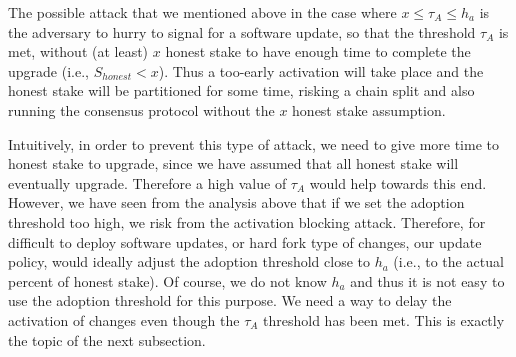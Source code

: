 The possible attack that we mentioned above in the case where $x \leq \tau_A \leq h_a$ is the adversary to hurry to signal for a software update, so that the threshold $\tau_A$ is met, without (at least) $x$ honest stake to have enough time to complete the upgrade (i.e., $S_{honest} < x$). Thus a too-early activation will take place and the honest stake will be partitioned for some time, risking a chain split and also running the consensus protocol without the $x$ honest stake assumption.

Intuitively, in order to prevent this type of attack, we need to give more time to honest stake to upgrade, since we have assumed that all honest stake will eventually upgrade. Therefore a high value of $\tau_A$ would help towards this end. However, we have seen from the analysis above that if we set the adoption threshold too high, we risk from the activation blocking attack. Therefore, for difficult to deploy software updates, or hard fork type of changes, our update policy, would ideally adjust the adoption threshold close to $h_a$ (i.e., to the actual percent of honest stake). Of course, we do not know $h_a$ and thus it is not easy to use the adoption threshold for this purpose. We need a way to delay the activation of changes even though the $\tau_A$ threshold has been met. This is exactly the topic of the next subsection.




